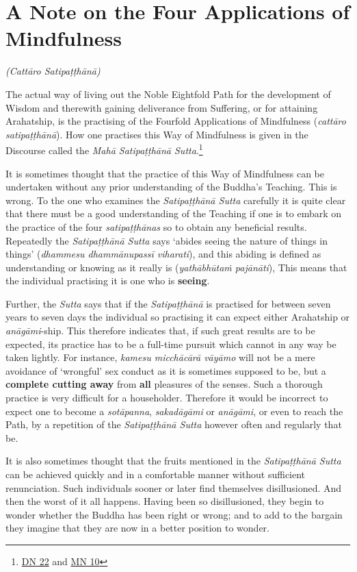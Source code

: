 \chapter{A Note on the Four Applications of Mindfulness}

\emph{(Cattāro Satipaṭṭhānā)}

\protect\hypertarget{start}{}{}The actual way of living out the Noble Eightfold Path for the development of Wisdom and therewith gaining deliverance from Suffering, or for attaining Arahatship, is the practising of the Fourfold Applications of Mindfulness (\emph{cattāro satipaṭṭhānā}). How one practises this Way of Mindfulness is given in the Discourse called the \emph{Mahā Satipaṭṭhānā Sutta}.\footnote{\href{https://suttacentral.net/dn22/en/sujato}{DN 22} and \href{https://suttacentral.net/mn10/en/sujato}{MN 10}}

It is sometimes thought that the practice of this Way of Mindfulness can be undertaken without any prior understanding of the Buddha's Teaching. This is wrong. To the one who examines the \emph{Satipaṭṭhānā Sutta} carefully it is quite clear that there must be a good understanding of the Teaching if one is to embark on the practice of the four \emph{satipaṭṭhānas} so to obtain any beneficial results. Repeatedly the \emph{Satipaṭṭhānā Sutta} says `abides seeing the nature of things in things' (\emph{dhammesu dhammānupassī viharati}), and this abiding is defined as understanding or knowing as it really is (\emph{yathābhūtaṁ pajānāti}), This means that the individual practising it is one who is \textbf{seeing}.

Further, the \emph{Sutta} says that if the \emph{Satipaṭṭhānā} is practised for between seven years to seven days the individual so practising it can expect either Arahatship or \emph{anāgāmi}-ship. This therefore indicates that, if such great results are to be expected, its practice has to be a full-time pursuit which cannot in any way be taken lightly. For instance, \emph{kamesu micchācārā vāyāmo} will not be a mere avoidance of `wrongful' sex conduct as it is sometimes supposed to be, but a \textbf{complete cutting away} from \textbf{all} pleasures of the senses. Such a thorough practice is very difficult for a householder. Therefore it would be incorrect to expect one to become a \emph{sotāpanna}, \emph{sakadāgāmi} or \emph{anāgāmi}, or even to reach the Path, by a repetition of the \emph{Satipaṭṭhānā Sutta} however often and regularly that be.

It is also sometimes thought that the fruits mentioned in the \emph{Satipaṭṭhānā Sutta} can be achieved quickly and in a comfortable manner without sufficient renunciation. Such individuals sooner or later find themselves disillusioned. And then the worst of it all happens. Having been so disillusioned, they begin to wonder whether the Buddha has been right or wrong; and to add to the bargain they imagine that they are now in a better position to wonder.

